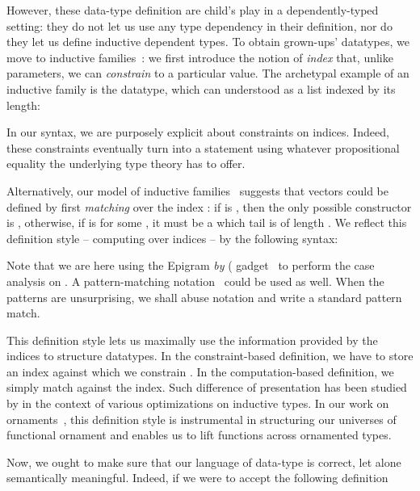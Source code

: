 \documentclass{scrartcl}
\theoremstyle{plain}
\theoremstyle{definition}
\begin{document}
However, these data-type definition are child's play in a
dependently-typed setting: they do not let us use any type dependency
in their definition, nor do they let us define inductive dependent 
types. To obtain grown-ups' datatypes, we move to inductive
families~\citep{dybjer:inductive-families}: we first introduce the notion of
\emph{index} that, unlike parameters, we can \emph{constrain} to a
particular value. The archetypal example of an inductive family is the
 datatype, which can understood as a list indexed by its
length:

In our syntax, we are purposely explicit about constraints on
indices. Indeed, these constraints eventually turn into a statement
using whatever propositional equality the underlying type theory has
to offer.




Alternatively, our model of inductive families~\citep{alti:lics09}
suggests that vectors could be defined by first \emph{matching} over
the index : if  is , then the only possible
constructor is , otherwise, if  is  for some
, it must be a  which tail is of length . We
reflect this definition style -- computing over indices -- by the
following syntax:

Note that we are here using the Epigram \emph{by} (
gadget~\citep{mcbride.mckinna:view-from-the-left} to perform the case
analysis on . A pattern-matching
notation~\citep{coquand:pattern-matching,sozeau:equations} could be
used as well. When the patterns are unsurprising, we shall abuse
notation and write a standard pattern match.

This definition style lets us maximally use the information provided
by the indices to structure datatypes. In the constraint-based
definition, we have to store an index  against which we
constrain . In the computation-based definition, we simply match
against the index. Such difference of presentation has been studied by
\citet{brady:index-inductive-families} in the context of various
optimizations on inductive types. In our work on
ornaments~\citep{mcbride:ornament,dagand:fun-orn}, this definition
style is instrumental in structuring our universes of functional
ornament and enables us to lift functions across ornamented types.



Now, we ought to make sure that our language of data-type is correct,
let alone semantically meaningful. Indeed, if we were to accept the
following definition
\end{document}
